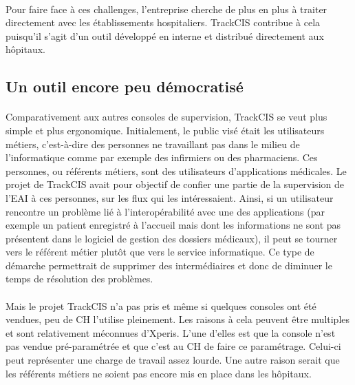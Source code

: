 			\paragraph{}%
			Pour faire face à ces challenges, l'entreprise cherche de plus 
			en plus à traiter directement avec les établissements hospitaliers. TrackCIS
			contribue à cela puisqu'il s'agit d'un outil développé en interne et
			distribué directement aux hôpitaux.
			
		\subsection{Un outil encore peu démocratisé}
			\paragraph{}%
			Comparativement aux autres consoles de supervision, TrackCIS se veut plus
			simple et plus ergonomique. Initialement, le public visé était les
			utilisateurs métiers, c'est-à-dire des personnes ne travaillant pas dans le
			milieu de l'informatique comme par exemple des infirmiers ou des pharmaciens.
			Ces personnes, ou référents métiers, sont des utilisateurs d'applications
			médicales. Le projet de TrackCIS avait pour objectif de confier une partie de
			la supervision de l'EAI à ces personnes, sur les flux qui les intéressaient.
			Ainsi, si un utilisateur rencontre un problème lié à l'interopérabilité avec
			une des applications (par exemple un patient enregistré à l'accueil mais dont
			les informations ne sont pas présentent dans le logiciel de gestion des
			dossiers médicaux), il peut se tourner vers le référent métier plutôt que
			vers le service informatique. Ce type de démarche permettrait de supprimer
			des intermédiaires et donc de diminuer le temps de résolution des problèmes.
			
			\paragraph{}%
			Mais le projet TrackCIS n'a pas pris et même si quelques consoles ont été
			vendues, peu de CH l'utilise pleinement. Les raisons à cela peuvent être
			multiples et sont relativement méconnues d'Xperis. L'une d'elles est que la
			console n'est pas vendue pré-paramétrée et que c'est au CH de faire ce
			paramétrage.
			Celui-ci peut représenter une charge de travail assez lourde. Une autre
			raison serait que les référents métiers ne soient pas encore mis en place
			dans les hôpitaux.
			
